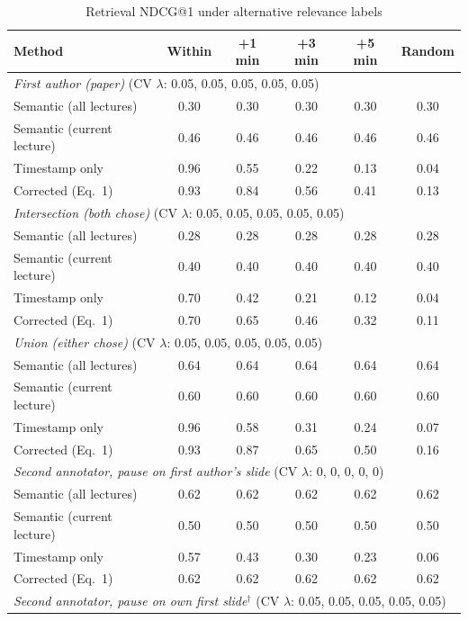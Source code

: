 \begin{table}[!htbp]
\centering
\caption{Retrieval NDCG@1 under alternative relevance labels}
\label{tab:sup_irr}
\small
\begin{tabular}{lccccc}
\toprule
\textbf{Method} & \textbf{Within} & \textbf{+1 min} & \textbf{+3 min} & \textbf{+5 min} & \textbf{Random} \\
\midrule
\multicolumn{6}{l}{\textit{First author (paper)} (CV $\lambda$: 0.05, 0.05, 0.05, 0.05, 0.05)} \\
Semantic (all lectures) & 0.30 & 0.30 & 0.30 & 0.30 & 0.30 \\
Semantic (current lecture) & 0.46 & 0.46 & 0.46 & 0.46 & 0.46 \\
Timestamp only & 0.96 & 0.55 & 0.22 & 0.13 & 0.04 \\
Corrected (Eq.~1) & 0.93 & 0.84 & 0.56 & 0.41 & 0.13 \\
\multicolumn{6}{l}{\textit{Intersection (both chose)} (CV $\lambda$: 0.05, 0.05, 0.05, 0.05, 0.05)} \\
Semantic (all lectures) & 0.28 & 0.28 & 0.28 & 0.28 & 0.28 \\
Semantic (current lecture) & 0.40 & 0.40 & 0.40 & 0.40 & 0.40 \\
Timestamp only & 0.70 & 0.42 & 0.21 & 0.12 & 0.04 \\
Corrected (Eq.~1) & 0.70 & 0.65 & 0.46 & 0.32 & 0.11 \\
\multicolumn{6}{l}{\textit{Union (either chose)} (CV $\lambda$: 0.05, 0.05, 0.05, 0.05, 0.05)} \\
Semantic (all lectures) & 0.64 & 0.64 & 0.64 & 0.64 & 0.64 \\
Semantic (current lecture) & 0.60 & 0.60 & 0.60 & 0.60 & 0.60 \\
Timestamp only & 0.96 & 0.58 & 0.31 & 0.24 & 0.07 \\
Corrected (Eq.~1) & 0.93 & 0.87 & 0.65 & 0.50 & 0.16 \\
\multicolumn{6}{l}{\textit{Second annotator, pause on first author's slide} (CV $\lambda$: 0, 0, 0, 0, 0)} \\
Semantic (all lectures) & 0.62 & 0.62 & 0.62 & 0.62 & 0.62 \\
Semantic (current lecture) & 0.50 & 0.50 & 0.50 & 0.50 & 0.50 \\
Timestamp only & 0.57 & 0.43 & 0.30 & 0.23 & 0.06 \\
Corrected (Eq.~1) & 0.62 & 0.62 & 0.62 & 0.62 & 0.62 \\
\multicolumn{6}{l}{\textit{Second annotator, pause on own first slide$^\dagger$} (CV $\lambda$: 0.05, 0.05, 0.05, 0.05, 0.05)} \\

\end{tabular}
\end{table}
